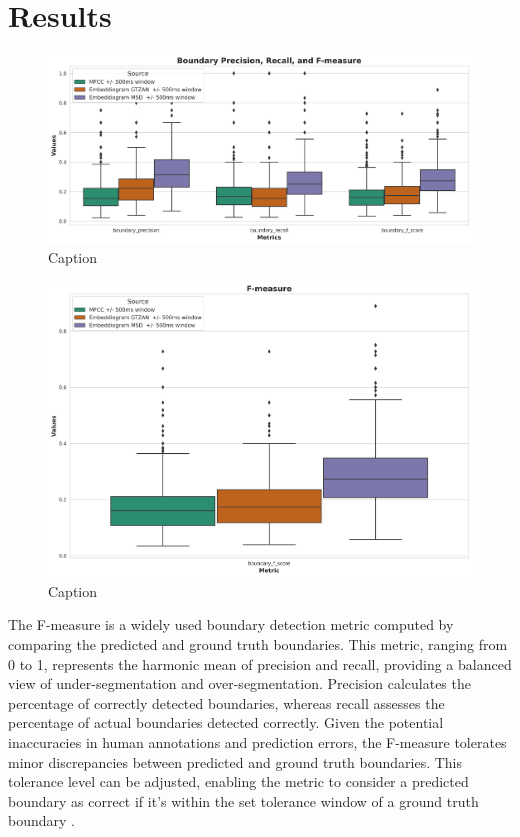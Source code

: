\chapter{Results}



\begin{figure}
    \centering
    \includegraphics[width=\textwidth]{figures/images/first results.png}
    \caption{Caption}
    \label{fig:boxplotmetrics}
\end{figure}

\begin{figure}
    \centering
    \includegraphics[width=\textwidth]{figures/images/f-measure.png}
    \caption{Caption}
    \label{fig:boxplotfmeasure}
\end{figure}


The F-measure is a widely used boundary detection metric computed by comparing the predicted and ground truth boundaries. This metric, ranging from 0 to 1, represents the harmonic mean of precision and recall, providing a balanced view of under-segmentation and over-segmentation. Precision calculates the percentage of correctly detected boundaries, whereas recall assesses the percentage of actual boundaries detected correctly. Given the potential inaccuracies in human annotations and prediction errors, the F-measure tolerates minor discrepancies between predicted and ground truth boundaries. This tolerance level can be adjusted, enabling the metric to consider a predicted boundary as correct if it's within the set tolerance window of a ground truth boundary \cite{Turnbull2007ABOOSTING}.

\newpage


